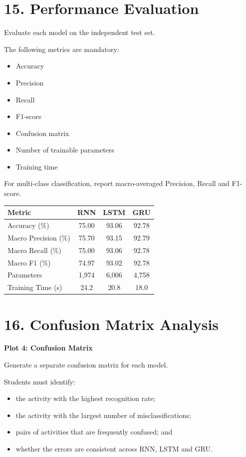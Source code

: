 \documentclass[10pt]{article}
\begin{document}
\section*{15. Performance Evaluation}

Evaluate each model on the independent test set.

The following metrics are mandatory:

\begin{itemize}
\item Accuracy
\item Precision
\item Recall
\item F1-score
\item Confusion matrix
\item Number of trainable parameters
\item Training time
\end{itemize}

For multi-class classification, report macro-averaged Precision, Recall and
F1-score.

\begin{center}
\begin{tabular}{|l|c|c|c|}
\hline
Metric & RNN & LSTM & GRU\\
\hline
Accuracy (\%) & 75.00 & 93.06 & 92.78\\
Macro Precision (\%) & 75.70 & 93.15 & 92.79\\
Macro Recall (\%) & 75.00 & 93.06 & 92.78\\
Macro F1 (\%) & 74.97 & 93.02 & 92.78\\
Parameters & 1,974 & 6,006 & 4,758\\
Training Time (s) & 24.2 & 20.8 & 18.0\\
\hline
\end{tabular}
\end{center}

\section*{16. Confusion Matrix Analysis}

\textbf{Plot 4: Confusion Matrix}

Generate a separate confusion matrix for each model.

Students must identify:

\begin{itemize}
\item the activity with the highest recognition rate;
\item the activity with the largest number of misclassifications;
\item pairs of activities that are frequently confused; and
\item whether the errors are consistent across RNN, LSTM and GRU.
\end{itemize}
\end{document}
